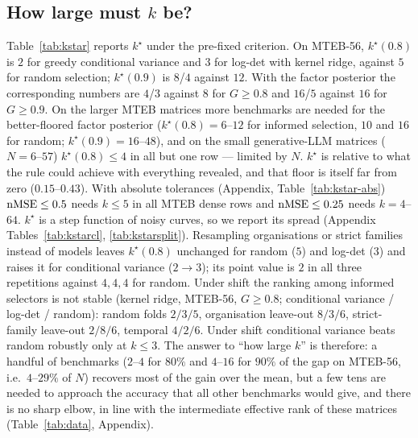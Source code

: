 \subsection{How large must $k$ be?}
\begin{table}[t]
\caption{Smallest $k$ whose 95\% bootstrap lower bound of the gap-closed fraction $G(k)$ reaches $0.8$ and $0.9$ (criterion fixed before the final runs; floor = same inference rule with all non-target benchmarks revealed, value in column ``floor''; ``rand.'', ``GV'' = greedy conditional variance, ``D-opt'' = greedy log-det). krr: kernel ridge, fa: factor-analysis posterior. Grids: $k\in\{1,2,\dots,6,8,10,12,16,20,24,32,48,64\}$ where $N$ allows.}
\label{tab:kstar}
\centering\scriptsize\setlength{\tabcolsep}{2.5pt}

\end{table}
Table~\ref{tab:kstar} reports $k^\star$ under the pre-fixed criterion. On MTEB-56, $k^\star(0.8)$ is $2$ for greedy conditional variance and $3$ for log-det with kernel ridge, against $5$ for random selection; $k^\star(0.9)$ is $8$/$4$ against $12$. With the factor posterior the corresponding numbers are $4$/$3$ against $8$ for $G\ge0.8$ and $16$/$5$ against $16$ for $G\ge0.9$. On the larger MTEB matrices more benchmarks are needed for the better-floored factor posterior ($k^\star(0.8)=6$--$12$ for informed selection, $10$ and $16$ for random; $k^\star(0.9)=16$--$48$), and on the small generative-LLM matrices ($N=6$--$57$) $k^\star(0.8)\le 4$ in all but one row --- limited by $N$. $k^\star$ is relative to what the rule could achieve with everything revealed, and that floor is itself far from zero ($0.15$--$0.43$). With absolute tolerances (Appendix, Table~\ref{tab:kstar-abs}) $\mathrm{nMSE}\le0.5$ needs $k\le5$ in all MTEB dense rows and $\mathrm{nMSE}\le0.25$ needs $k=4$--$64$. $k^\star$ is a step function of noisy curves, so we report its spread (Appendix Tables~\ref{tab:kstarcl}, \ref{tab:kstarsplit}). Resampling organisations or strict families instead of models leaves $k^\star(0.8)$ unchanged for random ($5$) and log-det ($3$) and raises it for conditional variance ($2\to3$); its point value is $2$ in all three repetitions against $4,4,4$ for random. Under shift the ranking among informed selectors is not stable (kernel ridge, MTEB-56, $G\ge0.8$; conditional variance / log-det / random): random folds $2/3/5$, organisation leave-out $8/3/6$, strict-family leave-out $2/8/6$, temporal $4/2/6$. Under shift conditional variance beats random robustly only at $k\le3$.
The answer to ``how large $k$'' is therefore: a handful of benchmarks ($2$--$4$ for $80\%$ and $4$--$16$ for $90\%$ of the gap on MTEB-56, i.e.\ $4$--$29\%$ of $N$) recovers most of the gain over the mean, but a few tens are needed to approach the accuracy that all other benchmarks would give, and there is no sharp elbow, in line with the intermediate effective rank of these matrices (Table~\ref{tab:data}, Appendix).


